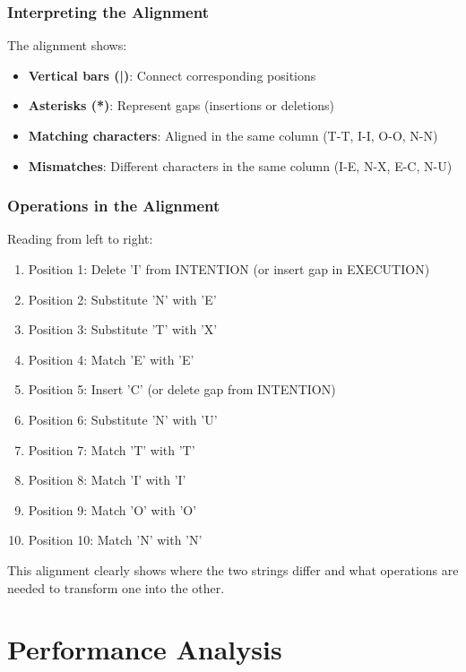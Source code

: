 \documentclass[11pt,a4paper]{article}
\theoremstyle{definition}
\theoremstyle{plain}
\theoremstyle{remark}
\begin{document}
\subsubsection{Interpreting the Alignment}

The alignment shows:
\begin{itemize}
    \item \textbf{Vertical bars (|)}: Connect corresponding positions
    \item \textbf{Asterisks (*)}: Represent gaps (insertions or deletions)
    \item \textbf{Matching characters}: Aligned in the same column (T-T, I-I, O-O, N-N)
    \item \textbf{Mismatches}: Different characters in the same column (I-E, N-X, E-C, N-U)
\end{itemize}

\subsubsection{Operations in the Alignment}

Reading from left to right:
\begin{enumerate}
    \item Position 1: Delete 'I' from INTENTION (or insert gap in EXECUTION)
    \item Position 2: Substitute 'N' with 'E'
    \item Position 3: Substitute 'T' with 'X'
    \item Position 4: Match 'E' with 'E'
    \item Position 5: Insert 'C' (or delete gap from INTENTION)
    \item Position 6: Substitute 'N' with 'U'
    \item Position 7: Match 'T' with 'T'
    \item Position 8: Match 'I' with 'I'
    \item Position 9: Match 'O' with 'O'
    \item Position 10: Match 'N' with 'N'
\end{enumerate}

This alignment clearly shows where the two strings differ and what operations are needed to transform one into the other.

\section{Performance Analysis}
\end{document}
